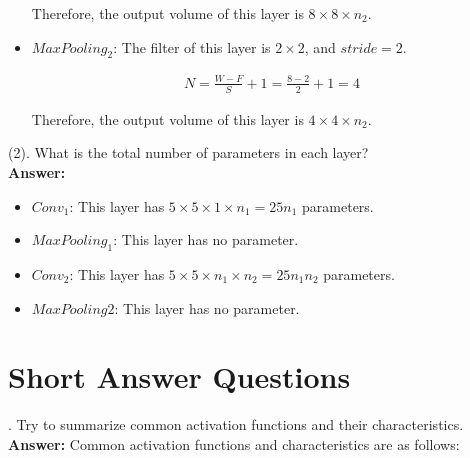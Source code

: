 \documentclass{article}
\begin{document}
\begin{itemize}
    Therefore, the output volume of this layer is $8 \times 8 \times n_2$.
    
    \item $MaxPooling_2$: The filter of this layer is $2 \times 2$, and $stride = 2$. 
    
    \begin{equation}\tag{$4$}
        \begin{aligned}
            N = \frac{W - F}{S} + 1 = \frac{8 - 2}{2} + 1 = 4
        \end{aligned}
    \end{equation} 
    
    Therefore, the output volume of this layer is $4 \times 4 \times n_2$.
    
\end{itemize}

(2). What is the total number of parameters in each layer? \\

\textbf{Answer:} 

\begin{itemize}
    \item $Conv_1$: This layer has $5 \times 5 \times 1 \times n_1 = 25n_1$ parameters.
    
    \item $MaxPooling_1$: This layer has no parameter.
    
    \item $Conv_2$: This layer has $5 \times 5 \times n_1 \times n_2 = 25n_1n_2$ parameters.
    
    \item $MaxPooling2$: This layer has no parameter.
    
\end{itemize}
 

\newpage
\section{Short Answer Questions}
. Try to summarize common activation functions and their characteristics.  \\ 

\textbf{Answer: } Common activation functions and characteristics are as follows:
\end{document}
